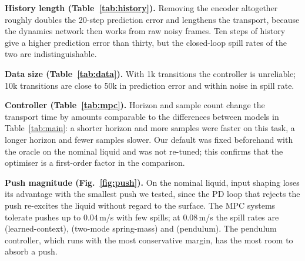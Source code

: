 \textbf{History length (Table~\ref{tab:history}).} Removing the encoder altogether roughly doubles the 20-step prediction error and lengthens the transport, because the dynamics network then works from raw noisy frames. Ten steps of history give a higher prediction error than thirty, but the closed-loop spill rates of the two are indistinguishable.

\textbf{Data size (Table~\ref{tab:data}).} With 1k transitions the controller is unreliable; 10k transitions are close to 50k in prediction error and within noise in spill rate.

\textbf{Controller (Table~\ref{tab:mpc}).} Horizon and sample count change the transport time by amounts comparable to the differences between models in Table~\ref{tab:main}: a shorter horizon and more samples were faster on this task, a longer horizon and fewer samples slower. Our default was fixed beforehand with the oracle on the nominal liquid and was not re-tuned; this confirms that the optimiser is a first-order factor in the comparison.

\textbf{Push magnitude (Fig.~\ref{fig:push}).} On the nominal liquid, input shaping loses its advantage with the smallest push we tested, since the PD loop that rejects the push re-excites the liquid without regard to the surface. The MPC systems tolerate pushes up to $0.04$\,m/s with few spills; at $0.08$\,m/s the spill rates are  (learned-context),  (two-mode spring-mass) and  (pendulum). The pendulum controller, which runs with the most conservative margin, has the most room to absorb a push.

